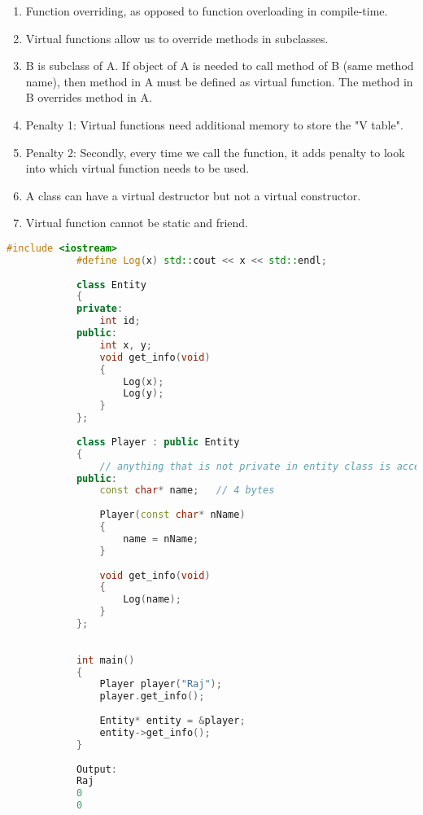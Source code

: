 \documentclass{article}
\begin{document}
        \begin{enumerate}
            \item Function overriding, as opposed to function overloading in compile-time.
            \item Virtual functions allow us to override methods in subclasses.
            \item B is subclass of A. If object of A is needed to call method of B (same method name), then method in A must be defined as virtual function. The method in B overrides method in A.
            \item Penalty 1: Virtual functions need additional memory to store the "V table". 
            \item Penalty 2: Secondly, every time we call the function, it adds penalty to look into which virtual function needs to be used. 
            \item A class can have a virtual destructor but not a virtual constructor.
            \item Virtual function cannot be static and friend.
    
        \end{enumerate}
    
        \begin{lstlisting}[language=C++, caption=Without virtual function example]
            #include <iostream>
            #define Log(x) std::cout << x << std::endl;
            
            class Entity
            {
            private:
            	int id;
            public:
            	int x, y;
            	void get_info(void)
            	{
            		Log(x);
            		Log(y);
            	}
            };
            
            class Player : public Entity
            {
            	// anything that is not private in entity class is accessible by player
            public:
            	const char* name;	// 4 bytes
            
            	Player(const char* nName)
            	{
            		name = nName;
            	}
            
            	void get_info(void) 
            	{
            		Log(name);
            	}
            };
            
            
            int main()
            {
            	Player player("Raj");
            	player.get_info();
            	
            	Entity* entity = &player;
            	entity->get_info();
            }
    
            Output:
            Raj
            0
            0
        \end{lstlisting}
        
\end{document}
